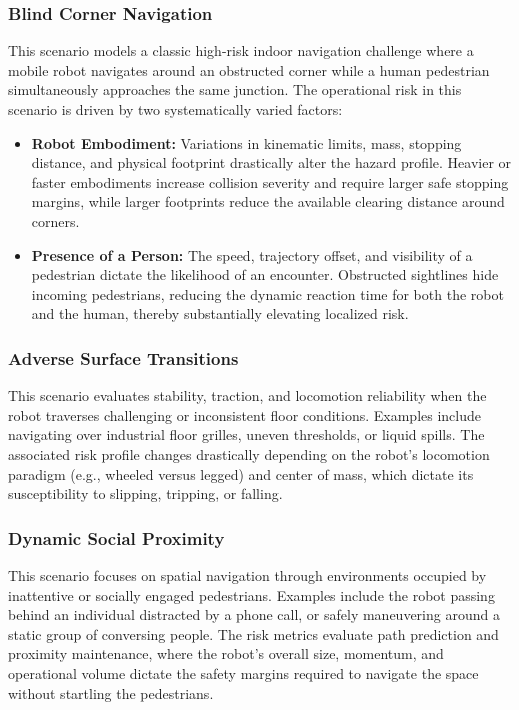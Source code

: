 \subsubsection{Blind Corner Navigation}
This scenario models a classic high-risk indoor navigation challenge where a mobile robot navigates around an obstructed corner while a human pedestrian simultaneously approaches the same junction. The operational risk in this scenario is driven by two systematically varied factors:
\begin{itemize}
    \item \textbf{Robot Embodiment:} Variations in kinematic limits, mass, stopping distance, and physical footprint drastically alter the hazard profile. Heavier or faster embodiments increase collision severity and require larger safe stopping margins, while larger footprints reduce the available clearing distance around corners.
    \item \textbf{Presence of a Person:} The speed, trajectory offset, and visibility of a pedestrian dictate the likelihood of an encounter. Obstructed sightlines hide incoming pedestrians, reducing the dynamic reaction time for both the robot and the human, thereby substantially elevating localized risk.
\end{itemize}

\subsubsection{Adverse Surface Transitions}
This scenario evaluates stability, traction, and locomotion reliability when the robot traverses challenging or inconsistent floor conditions. Examples include navigating over industrial floor grilles, uneven thresholds, or liquid spills. The associated risk profile changes drastically depending on the robot's locomotion paradigm (e.g., wheeled versus legged) and center of mass, which dictate its susceptibility to slipping, tripping, or falling.

\subsubsection{Dynamic Social Proximity}
This scenario focuses on spatial navigation through environments occupied by inattentive or socially engaged pedestrians. Examples include the robot passing behind an individual distracted by a phone call, or safely maneuvering around a static group of conversing people. The risk metrics evaluate path prediction and proximity maintenance, where the robot's overall size, momentum, and operational volume dictate the safety margins required to navigate the space without startling the pedestrians.